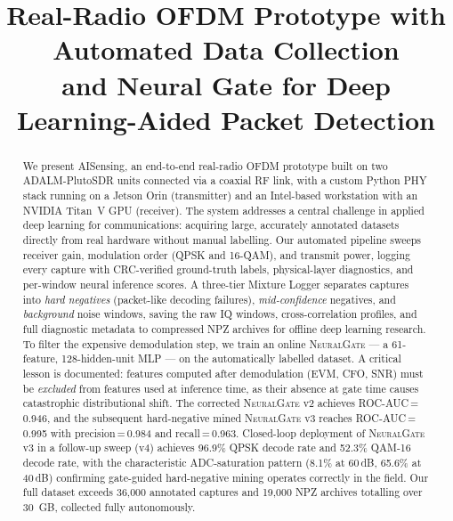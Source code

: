 \documentclass[conference]{IEEEtran}
\newcommand{\sys}{AISensing}
\newcommand{\gate}{\textsc{NeuralGate}}
\begin{document}
\title{Real-Radio OFDM Prototype with Automated Data Collection\\
       and Neural Gate for Deep Learning-Aided Packet Detection}

\author{
}

\maketitle

\begin{abstract}
We present \sys, an end-to-end real-radio OFDM prototype built on two
ADALM-PlutoSDR units connected via a coaxial RF link, with a custom
Python PHY stack running on a Jetson Orin (transmitter) and an
Intel-based workstation with an NVIDIA Titan~V GPU (receiver).
The system addresses a central challenge in applied deep learning for
communications: acquiring large, accurately annotated datasets directly
from real hardware without manual labelling.
Our automated pipeline sweeps receiver gain, modulation order
(QPSK and 16-QAM), and transmit power, logging every capture with
CRC-verified ground-truth labels, physical-layer diagnostics, and
per-window neural inference scores.
A three-tier Mixture Logger separates captures into
\emph{hard negatives} (packet-like decoding failures),
\emph{mid-confidence} negatives, and
\emph{background} noise windows, saving the raw IQ windows, cross-correlation
profiles, and full diagnostic metadata to compressed NPZ archives for
offline deep learning research.
To filter the expensive demodulation step, we train an online
\gate{} — a 61-feature, 128-hidden-unit MLP — on the automatically
labelled dataset.
A critical lesson is documented: features computed after demodulation
(EVM, CFO, SNR) must be \emph{excluded} from features used at inference
time, as their absence at gate time causes catastrophic distributional
shift.
The corrected \gate{} v2 achieves ROC-AUC\,=\,0.946, and the subsequent
hard-negative mined \gate{} v3 reaches ROC-AUC\,=\,0.995 with
precision\,=\,0.984 and recall\,=\,0.963.
Closed-loop deployment of \gate{} v3 in a follow-up sweep (v4) achieves
96.9\% QPSK decode rate and 52.3\% QAM-16 decode rate, with the
characteristic ADC-saturation pattern (8.1\% at 60\,dB, 65.6\% at 40\,dB)
confirming gate-guided hard-negative mining operates correctly in the field.
Our full dataset exceeds 36{,}000 annotated captures and 19{,}000 NPZ
archives totalling over 30~GB, collected fully autonomously.
\end{abstract}
\end{document}
